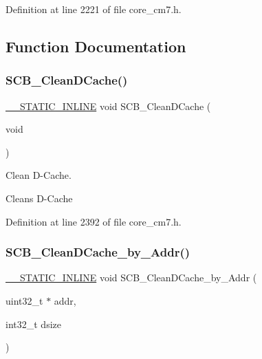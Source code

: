 Definition at line 2221 of file core\+\_\+cm7.\+h.



\subsection{Function Documentation}
\mbox{\label{group___c_m_s_i_s___core___cache_functions_ga55583e3065c6eabca204b8b89b121c4c}} 
\subsubsection{\texorpdfstring{S\+C\+B\+\_\+\+Clean\+D\+Cache()}{SCB\_CleanDCache()}}
{\footnotesize\ttfamily \hyperlink{cmsis__iccarm_8h_aba87361bfad2ae52cfe2f40c1a1dbf9c}{\+\_\+\+\_\+\+S\+T\+A\+T\+I\+C\+\_\+\+I\+N\+L\+I\+NE} void S\+C\+B\+\_\+\+Clean\+D\+Cache (\begin{DoxyParamCaption}\item[{void}]{ }\end{DoxyParamCaption})}



Clean D-\/\+Cache. 

Cleans D-\/\+Cache 

Definition at line 2392 of file core\+\_\+cm7.\+h.

\mbox{\label{group___c_m_s_i_s___core___cache_functions_ga696fadbf7b9cc71dad42fab61873a40d}} 
\subsubsection{\texorpdfstring{S\+C\+B\+\_\+\+Clean\+D\+Cache\+\_\+by\+\_\+\+Addr()}{SCB\_CleanDCache\_by\_Addr()}}
{\footnotesize\ttfamily \hyperlink{cmsis__iccarm_8h_aba87361bfad2ae52cfe2f40c1a1dbf9c}{\+\_\+\+\_\+\+S\+T\+A\+T\+I\+C\+\_\+\+I\+N\+L\+I\+NE} void S\+C\+B\+\_\+\+Clean\+D\+Cache\+\_\+by\+\_\+\+Addr (\begin{DoxyParamCaption}\item[{uint32\+\_\+t $\ast$}]{addr,  }\item[{int32\+\_\+t}]{dsize }\end{DoxyParamCaption})}




